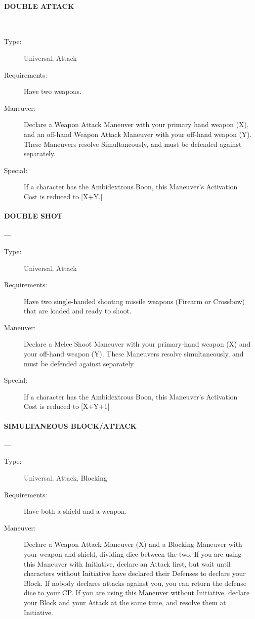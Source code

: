 \documentclass[oneside,11pt,english]{book}
\begin{document}
\paragraph{\large\label{man:DOUBLE ATTACK} DOUBLE ATTACK}---\quad{\large[X+Y+1]}
\vspace{-10pt}\begin{description} 
\item [Type:] Universal, Attack
\item [Requirements:] Have two weapons.
\item [Maneuver:] Declare a Weapon Attack Maneuver with your primary hand weapon (X), and an off-hand 
Weapon Attack Maneuver with your off-hand weapon (Y). These Maneuvers resolve Simultaneously, and 
must be defended against separately. 
\item [Special:] If a character has the Ambidextrous Boon, this Maneuver’s Activation Cost is reduced to [X+Y.] 
\end{description}

\paragraph{\large\label{man:DOUBLE SHOT} DOUBLE SHOT}---\quad{\large[X+Y+2]}
\vspace{-10pt}\begin{description} 
\item [Type:] Universal, Attack 
\item [Requirements:] Have two single-handed shooting missile weapons (Firearm or Crossbow) that are loaded 
and ready to shoot. 
\item [Maneuver:] Declare a Melee Shoot Maneuver with your primary-hand weapon (X) and your off-hand 
weapon (Y). These Maneuvers resolve simultaneously, and must be defended against separately. 
\item [Special:] If a character has the Ambidextrous Boon, this Maneuver’s Activation Cost is reduced to 
[X+Y+1] 
\end{description}
\paragraph{\large\label{man:SIMULTANEOUS BLOCK/ATTACK} SIMULTANEOUS BLOCK/ATTACK}---\quad{\large[X+Y]}
\vspace{-10pt}\begin{description} 
\item [Type:] Universal, Attack, Blocking 
\item [Requirements:] Have both a shield and a weapon. 
\item [Maneuver:] Declare a Weapon Attack Maneuver (X) and a Blocking Maneuver with your weapon and 
shield, dividing dice between the two. 
If you are using this Maneuver with Initiative, declare an Attack first, but wait until characters without 
Initiative have declared their Defenses to declare your Block. If nobody declares attacks against you, you 
can return the defense dice to your CP. 
If you are using this Maneuver without Initiative, declare your Block and your Attack at the same time, 
and resolve them at Initiative. 
\end{description}
\end{document}

